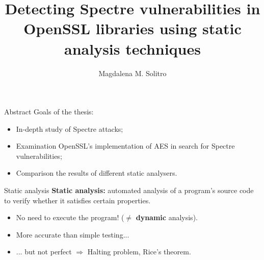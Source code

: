 \documentclass[beamer={noamsthm,10pt},target=mst]{thud}[2014/03/11]
\title{Detecting Spectre vulnerabilities in OpenSSL libraries using static analysis techniques}
\author{Magdalena M. Solitro}
\begin{document}
	
		\maketitle
		
		\begin{frame}{Abstract}
			Goals of the thesis:
			\begin{itemize}
				\item In-depth study of Spectre attacks;
				\item Examination OpenSSL's implementation of AES in search for Spectre vulnerabilities;
				\item Comparison the results of different static analysers.
			\end{itemize}
		\end{frame}
		
		
		\begin{frame}{Static analysis}
			\textbf{Static analysis:} automated analysis of a program's source code to verify whether it satisfies certain properties.
			\begin{itemize}
				\item No need to execute the program! ($\neq$ \textbf{dynamic} analysis).
				\item More accurate than simple testing...
				\item ... but not perfect $\Longrightarrow$ Halting problem, Rice's theorem.
			\end{itemize} 
			\vspace{1cm}
		\end{frame}
		
		
\end{document}
